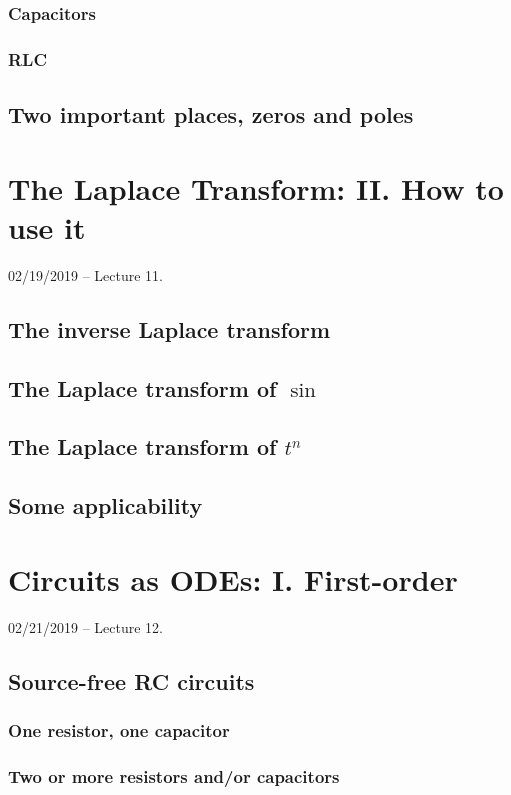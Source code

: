\documentclass[11pt]{book}
\begin{document}
\subsection{Capacitors}
\subsection{RLC}
\section{Two important places, zeros and poles}



\chapter{The Laplace Transform: II. How to use it}
02/19/2019 – Lecture 11. 
\section{The inverse Laplace transform}
\section{The Laplace transform of $\sin$}
\section{The Laplace transform of $t^n$}
\section{Some applicability}



\chapter{Circuits as ODEs: I. First-order}
02/21/2019 – Lecture 12. 
\section{Source-free RC circuits}
\subsection{One resistor, one capacitor}
\subsection{Two or more resistors and/or capacitors}
\end{document}
